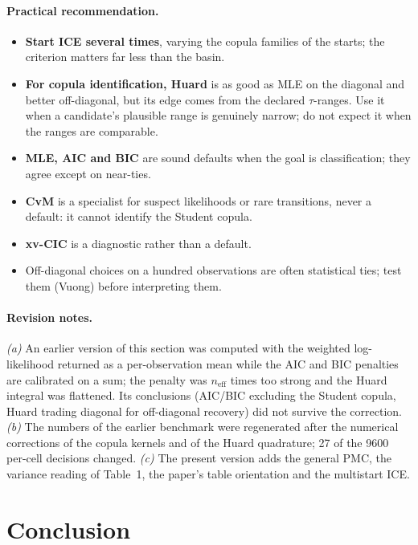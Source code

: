 \documentclass[11pt,a4paper]{article}
\begin{document}
\paragraph{Practical recommendation.}
\begin{itemize}
  \item \textbf{Start ICE several times}, varying the copula families of the
        starts; the criterion matters far less than the basin.
  \item \textbf{For copula identification, Huard} is as good as MLE on the
        diagonal and better off-diagonal, but its edge comes from the declared
        $\tau$-ranges. Use it when a candidate's plausible range is genuinely
        narrow; do not expect it when the ranges are comparable.
  \item \textbf{MLE, AIC and BIC} are sound defaults when the goal is
        classification; they agree except on near-ties.
  \item \textbf{CvM} is a specialist for suspect likelihoods or rare
        transitions, never a default: it cannot identify the Student copula.
  \item \textbf{xv-CIC} is a diagnostic rather than a default.
  \item Off-diagonal choices on a hundred observations are often
        statistical ties; test them (Vuong) before interpreting them.
\end{itemize}

\paragraph{Revision notes.} \emph{(a)} An earlier version of this section was
computed with the weighted log-likelihood returned as a per-observation mean
while the AIC and BIC penalties are calibrated on a sum; the penalty was
$n_{\text{eff}}$ times too strong and the Huard integral was flattened. Its
conclusions (AIC/BIC excluding the Student copula, Huard trading diagonal for
off-diagonal recovery) did not survive the correction. \emph{(b)} The numbers
of the earlier benchmark were regenerated after the numerical corrections of
the copula kernels and of the Huard quadrature; 27 of the 9600 per-cell
decisions changed. \emph{(c)} The present version adds the general PMC, the
variance reading of Table~1, the paper's table orientation and the multistart
ICE.

\section{Conclusion}\label{sec:conclusion}
\end{document}
